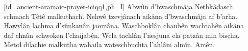 %
\setcounter{ulSongNumber}{500}


[id={ancient-aramaic-prayer-iciqq1},ph={I}]
  \beginverse\justifycenter
    \vspace{3em}
    Abwûn d'bwaschmâja
    \vspace{1em}
    Nethkâdasch schmach
    \vspace{1em}
    Têtê malkuthach.
    \vspace{1em}
    Nehwê tzevjânach aikâna d'bwaschmâja af b'arha.
    \vspace{1em}
    Hawvlân lachma d'sûnkanân jaomâna.
    \vspace{1em}
    Waschboklân chaubên wachtahên aikâna\\
    daf chnân schwoken l'chaijabên.
    \vspace{1em}
    Wela tachlân l'nesjuna
    \vspace{1em}
    ela patzân min bischa.
    \vspace{1em}
    Metol dilachie malkutha wahaila wateschbuchta l'ahlâm almîn.
    \vspace{1em}
    Amên.
    \vspace{5em}
  \endverse
  \brk %
